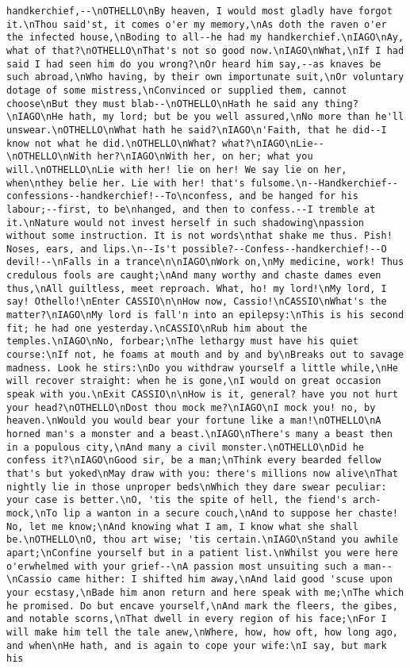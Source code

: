 \begin{verbatim}
handkerchief,--\nOTHELLO\nBy heaven, I would most gladly have forgot it.\nThou said'st, it comes o'er my memory,\nAs doth the raven o'er the infected house,\nBoding to all--he had my handkerchief.\nIAGO\nAy, what of that?\nOTHELLO\nThat's not so good now.\nIAGO\nWhat,\nIf I had said I had seen him do you wrong?\nOr heard him say,--as knaves be such abroad,\nWho having, by their own importunate suit,\nOr voluntary dotage of some mistress,\nConvinced or supplied them, cannot choose\nBut they must blab--\nOTHELLO\nHath he said any thing?\nIAGO\nHe hath, my lord; but be you well assured,\nNo more than he'll unswear.\nOTHELLO\nWhat hath he said?\nIAGO\n'Faith, that he did--I know not what he did.\nOTHELLO\nWhat? what?\nIAGO\nLie--\nOTHELLO\nWith her?\nIAGO\nWith her, on her; what you will.\nOTHELLO\nLie with her! lie on her! We say lie on her, when\nthey belie her. Lie with her! that's fulsome.\n--Handkerchief--confessions--handkerchief!--To\nconfess, and be hanged for his labour;--first, to be\nhanged, and then to confess.--I tremble at it.\nNature would not invest herself in such shadowing\npassion without some instruction. It is not words\nthat shake me thus. Pish! Noses, ears, and lips.\n--Is't possible?--Confess--handkerchief!--O devil!--\nFalls in a trance\n\nIAGO\nWork on,\nMy medicine, work! Thus credulous fools are caught;\nAnd many worthy and chaste dames even thus,\nAll guiltless, meet reproach. What, ho! my lord!\nMy lord, I say! Othello!\nEnter CASSIO\n\nHow now, Cassio!\nCASSIO\nWhat's the matter?\nIAGO\nMy lord is fall'n into an epilepsy:\nThis is his second fit; he had one yesterday.\nCASSIO\nRub him about the temples.\nIAGO\nNo, forbear;\nThe lethargy must have his quiet course:\nIf not, he foams at mouth and by and by\nBreaks out to savage madness. Look he stirs:\nDo you withdraw yourself a little while,\nHe will recover straight: when he is gone,\nI would on great occasion speak with you.\nExit CASSIO\n\nHow is it, general? have you not hurt your head?\nOTHELLO\nDost thou mock me?\nIAGO\nI mock you! no, by heaven.\nWould you would bear your fortune like a man!\nOTHELLO\nA horned man's a monster and a beast.\nIAGO\nThere's many a beast then in a populous city,\nAnd many a civil monster.\nOTHELLO\nDid he confess it?\nIAGO\nGood sir, be a man;\nThink every bearded fellow that's but yoked\nMay draw with you: there's millions now alive\nThat nightly lie in those unproper beds\nWhich they dare swear peculiar: your case is better.\nO, 'tis the spite of hell, the fiend's arch-mock,\nTo lip a wanton in a secure couch,\nAnd to suppose her chaste! No, let me know;\nAnd knowing what I am, I know what she shall be.\nOTHELLO\nO, thou art wise; 'tis certain.\nIAGO\nStand you awhile apart;\nConfine yourself but in a patient list.\nWhilst you were here o'erwhelmed with your grief--\nA passion most unsuiting such a man--\nCassio came hither: I shifted him away,\nAnd laid good 'scuse upon your ecstasy,\nBade him anon return and here speak with me;\nThe which he promised. Do but encave yourself,\nAnd mark the fleers, the gibes, and notable scorns,\nThat dwell in every region of his face;\nFor I will make him tell the tale anew,\nWhere, how, how oft, how long ago, and when\nHe hath, and is again to cope your wife:\nI say, but mark his 
\end{verbatim}
